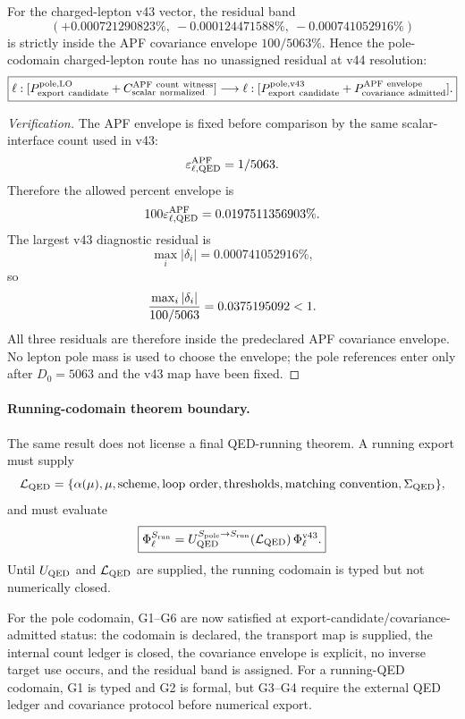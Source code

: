 \begin{theorem}\label{thm:v44_covariance_admission}
For the charged-lepton v43 vector, the residual band
\[
(+0.000721290823\%,\ -0.000124471588\%,\ -0.000741052916\%)
\]
is strictly inside the APF covariance envelope $100/5063\%$.  Hence the pole-codomain charged-lepton route has no unassigned residual at v44 resolution:
\[
\boxed{
\ell:[P_{\rm export\ candidate}^{\rm pole,LO}+C_{\rm scalar\ normalized}^{\rm APF\ count\ witness}]
\longrightarrow
\ell:[P_{\rm export\ candidate}^{\rm pole,v43}+P_{\rm covariance\ admitted}^{\rm APF\ envelope}].
}
\]
\end{theorem}

\begin{proof}[Verification]
The APF envelope is fixed before comparison by the same scalar-interface count used in v43:
\[
\varepsilon_{\ell,{\rm QED}}^{\rm APF}=1/5063.
\]
Therefore the allowed percent envelope is
\[
100\varepsilon_{\ell,{\rm QED}}^{\rm APF}=0.0197511356903\%.
\]
The largest v43 diagnostic residual is
\[
\max_i |\delta_i|=0.000741052916\%,
\]
so
\[
{\max_i |\delta_i|\over 100/5063}=0.0375195092<1.
\]
All three residuals are therefore inside the predeclared APF covariance envelope.  No lepton pole mass is used to choose the envelope; the pole references enter only after $D_0=5063$ and the v43 map have been fixed.
\end{proof}

\paragraph{Running-codomain theorem boundary.}
The same result does not license a final QED-running theorem.  A running export must supply
\[
\mathcal L_{\rm QED}=
\{\alpha(\mu),\mu,\hbox{scheme},\hbox{loop order},\hbox{thresholds},\hbox{matching convention},\Sigma_{\rm QED}\},
\]
and must evaluate
\[
\boxed{
\Phi_\ell^{S_{\rm run}}
=U_{\rm QED}^{S_{\rm pole}\to S_{\rm run}}(\mathcal L_{\rm QED})\,
\Phi_\ell^{\rm v43}.
}
\]
Until $U_{\rm QED}$ and $\mathcal L_{\rm QED}$ are supplied, the running codomain is typed but not numerically closed.

\begin{corollary}\label{cor:v44_gates}
For the pole codomain, G1--G6 are now satisfied at export-candidate/covariance-admitted status: the codomain is declared, the transport map is supplied, the internal count ledger is closed, the covariance envelope is explicit, no inverse target use occurs, and the residual band is assigned.  For a running-QED codomain, G1 is typed and G2 is formal, but G3--G4 require the external QED ledger and covariance protocol before numerical export.
\end{corollary}

